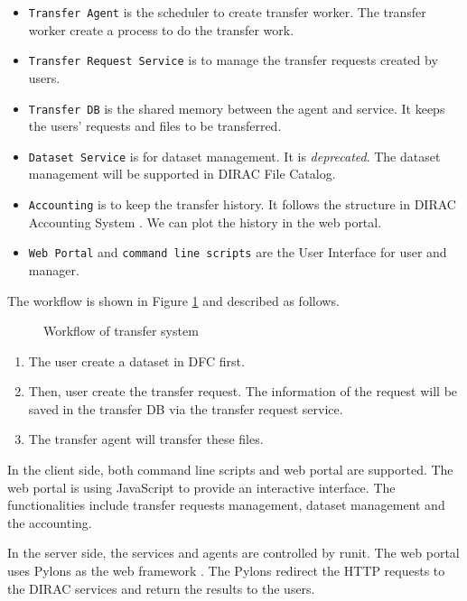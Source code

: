 \begin{itemize}
    \item {\tt Transfer Agent} is the scheduler to create transfer worker.
          The transfer worker create a process to do the transfer work.
    \item {\tt Transfer Request Service} is to manage the transfer requests
          created by users.
    \item {\tt Transfer DB} is the shared memory between the agent and 
          service. It keeps the users' requests and files to be transferred.
    \item {\tt Dataset Service} is for dataset management. It is 
          {\em deprecated}. The dataset management will be supported in DIRAC
          File Catalog.
    \item {\tt Accounting} is to keep the transfer history.
          It follows the structure in DIRAC Accounting System
          \cite{bib:diracacct}.
          We can plot the history in the web portal.
    \item {\tt Web Portal} and {\tt command line scripts} are the 
          User Interface for user and manager.
\end{itemize}

The workflow is shown in Figure \ref{fig:workflow} and described as follows.
\begin{figure}
    
    \caption{Workflow of transfer system} \label{fig:workflow}
\end{figure}

\begin{enumerate}
\item The user create a dataset in DFC first.
\item Then, user create the transfer request.
The information of the request will be saved in the transfer DB via
the transfer request service.
\item The transfer agent will transfer these files.
\end{enumerate}

In the client side, both command line scripts and web portal are supported.
The web portal 
\cite{bib:webportal}
is using JavaScript to provide an interactive interface. The functionalities
include transfer requests management, dataset management and the 
accounting.

In the server side, the services and agents are controlled by runit.
The web portal uses Pylons as the web framework
\cite{bib:webportal}.
The Pylons redirect the HTTP requests to the DIRAC services and 
return the results to the users.
